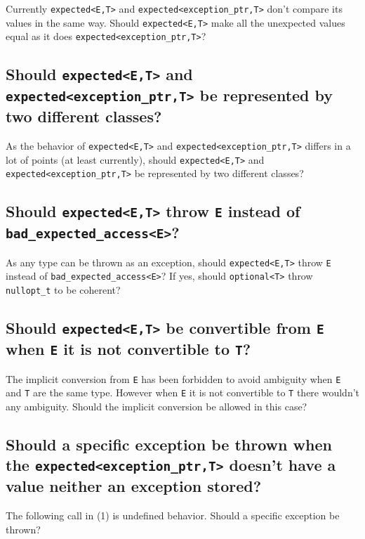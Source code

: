 \documentclass[a4paper,10pt]{article}
\newcommand{\cpp}[1]{\lstinline{#1}}
\begin{document}
Currently \cpp{expected<E,T>} and \cpp{expected<exception_ptr,T>} don't compare its values in the same way.
Should \cpp{expected<E,T>} make all the unexpected values equal as it does \cpp{expected<exception_ptr,T>}?

\subsection{Should \cpp{expected<E,T>} and \cpp{expected<exception_ptr,T>} be represented by two different classes?}

As the behavior of \cpp{expected<E,T>} and \cpp{expected<exception_ptr,T>} differs in a lot of points (at least currently), should \cpp{expected<E,T>} and \cpp{expected<exception_ptr,T>} be represented by two different classes?

\subsection{Should \cpp{expected<E,T>} throw \cpp{E} instead of \cpp{bad_expected_access<E>}?}

As any type can be thrown as an exception, should \cpp{expected<E,T>} throw \cpp{E} instead of \cpp{bad_expected_access<E>}? 
If yes, should \cpp{optional<T>} throw \cpp{nullopt_t} to be coherent? 

\subsection{Should \cpp{expected<E,T>} be convertible from \cpp{E} when \cpp{E} it is not convertible to \cpp{T}?}

The implicit conversion from \cpp{E} has been forbidden to avoid ambiguity when \cpp{E} and \cpp{T} are the same type. 
However when \cpp{E} it is not convertible to \cpp{T} there wouldn't any ambiguity. 
Should the implicit conversion be allowed in this case?

\subsection{Should a specific exception be thrown when the \cpp{expected<exception_ptr,T>} doesn't have a value neither an exception stored?}

The following call in (1) is undefined behavior. Should a specific exception be thrown?
\end{document}
